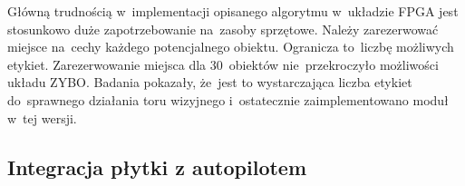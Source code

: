 Główną trudnością w~implementacji opisanego algorytmu w~układzie FPGA jest stosunkowo duże zapotrzebowanie na~zasoby sprzętowe. 
Należy zarezerwować miejsce na~cechy każdego potencjalnego obiektu. 
Ogranicza to~liczbę możliwych etykiet. 
Zarezerwowanie miejsca dla 30~obiektów nie~przekroczyło możliwości układu ZYBO. 
Badania pokazały, że~jest to wystarczająca liczba etykiet do~sprawnego działania toru wizyjnego i~ostatecznie zaimplementowano moduł w~tej wersji.\par


\subsection{Integracja płytki z autopilotem}
\label{sec:integracja_plytka_autopilot}

